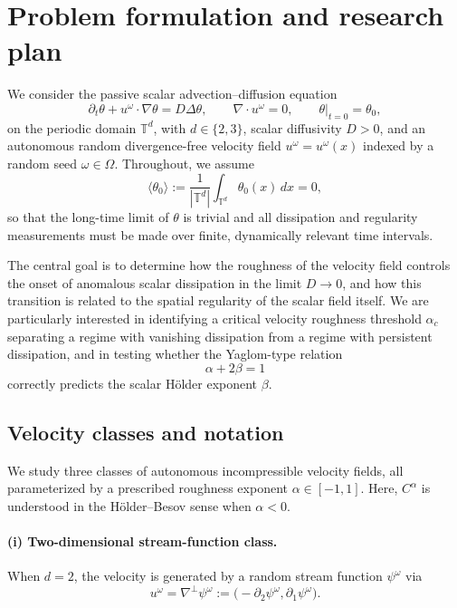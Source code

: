 \section{Problem formulation and research plan}
\label{sec:problem}

We consider the passive scalar advection--diffusion equation
\begin{equation}
\partial_t \theta + u^\omega \cdot \nabla \theta = D \Delta \theta,
\qquad \nabla \cdot u^\omega = 0,
\qquad \theta|_{t=0} = \theta_0,
\label{eq:scalar}
\end{equation}
on the periodic domain $\mathbb{T}^d$, with $d\in\{2,3\}$, scalar diffusivity $D>0$, and an autonomous random divergence-free velocity field $u^\omega=u^\omega(x)$ indexed by a random seed $\omega \in \Omega$. Throughout, we assume
\[
\langle \theta_0 \rangle := \frac{1}{|\mathbb{T}^d|}\int_{\mathbb{T}^d}\theta_0(x)\,dx = 0,
\]
so that the long-time limit of $\theta$ is trivial and all dissipation and regularity measurements must be made over finite, dynamically relevant time intervals.

The central goal is to determine how the roughness of the velocity field controls the onset of anomalous scalar dissipation in the limit $D\to0$, and how this transition is related to the spatial regularity of the scalar field itself. We are particularly interested in identifying a critical velocity roughness threshold $\alpha_c$ separating a regime with vanishing dissipation from a regime with persistent dissipation, and in testing whether the Yaglom-type relation
\begin{equation}
\alpha + 2\beta = 1
\label{eq:yaglom}
\end{equation}
correctly predicts the scalar H\"older exponent $\beta$.

\subsection{Velocity classes and notation}

We study three classes of autonomous incompressible velocity fields, all parameterized by a prescribed roughness exponent $\alpha\in[-1,1]$. Here, $C^\alpha$ is understood in the H\"older--Besov sense when $\alpha<0$.

\paragraph{(i) Two-dimensional stream-function class.}
When $d=2$, the velocity is generated by a random stream function $\psi^\omega$ via
\begin{equation}
u^\omega = \nabla^\perp \psi^\omega
:= \bigl(-\partial_2 \psi^\omega,\partial_1 \psi^\omega\bigr).
\label{eq:stream}
\end{equation}

